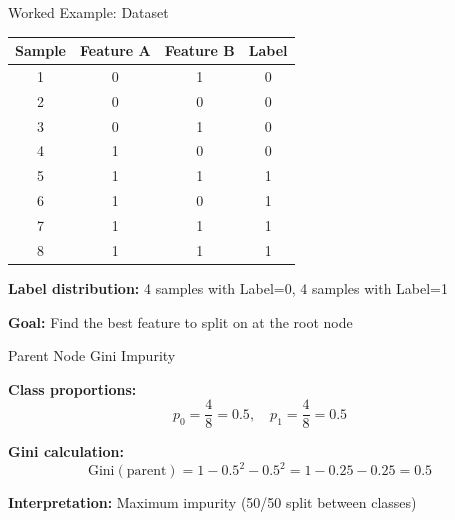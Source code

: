 \documentclass[aspectratio=169]{beamer}
\begin{document}
\begin{frame}{Worked Example: Dataset}

\centering
\begin{tabular}{cccc}
\toprule
Sample & Feature A & Feature B & Label \\
\midrule
1 & 0 & 1 & 0 \\
2 & 0 & 0 & 0 \\
3 & 0 & 1 & 0 \\
4 & 1 & 0 & 0 \\
5 & 1 & 1 & 1 \\
6 & 1 & 0 & 1 \\
7 & 1 & 1 & 1 \\
8 & 1 & 1 & 1 \\
\bottomrule
\end{tabular}

\vspace{1em}

\textbf{Label distribution:} 4 samples with Label=0, 4 samples with Label=1

\vspace{0.5em}

\textbf{Goal:} Find the best feature to split on at the root node

\end{frame}

\begin{frame}{Parent Node Gini Impurity}

\textbf{Class proportions:}
\[
p_0 = \frac{4}{8} = 0.5, \quad p_1 = \frac{4}{8} = 0.5
\]

\pause
\vspace{1em}

\textbf{Gini calculation:}
\[
\text{Gini}(\text{parent}) = 1 - 0.5^2 - 0.5^2 = 1 - 0.25 - 0.25 = 0.5
\]

\pause
\vspace{1em}

\textbf{Interpretation:} Maximum impurity (50/50 split between classes)

\end{frame}
\end{document}
